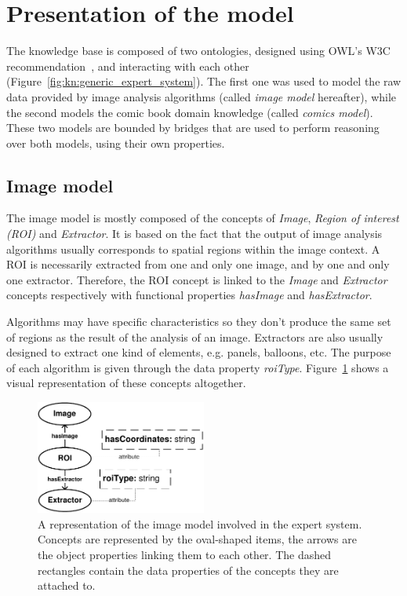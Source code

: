 
\section{Presentation of the model} %
\label{sec:kn:model}

The knowledge base is composed of two ontologies, designed using OWL's W3C recommendation~\cite{McGuinness2004}, and interacting with each other (Figure~\ref{fig:kn:generic_expert_system}).
The first one was used to model the raw data provided by image analysis algorithms (called \textit{image model} hereafter), while the second models the comic book domain knowledge (called \textit{comics model}).
These two models are bounded by bridges that are used to perform reasoning over both models, using their own properties.

\subsection{Image model}
The image model is mostly composed of the concepts of \textit{Image}, \textit{Region of interest (ROI)} and \textit{Extractor}.
It is based on the fact that the output of image analysis algorithms usually corresponds to spatial regions within the image context.
A ROI is necessarily extracted from one and only one image, and by one and only one extractor.
Therefore, the ROI concept is linked to the \textit{Image} and \textit{Extractor} concepts respectively with functional properties \textit{hasImage} and \textit{hasExtractor}.

Algorithms may have specific characteristics so they don't produce the same set of regions as the result of the analysis of an image.
Extractors are also usually designed to extract one kind of elements, e.g. panels, balloons, etc.
The purpose of each algorithm is given through the data property \textit{roiType}.
Figure~\ref{fig:kn:model_image} shows a visual representation of these concepts altogether.

 \begin{figure}[!ht]
   \centering
  \includegraphics[width=0.5\textwidth]{model_image.pdf}
  \caption[A representation of the image model involved in the expert system]{A representation of the image model involved in the expert system. Concepts are represented by the oval-shaped items, the arrows are the object properties linking them to each other. The dashed rectangles contain the data properties of the concepts they are attached to.}
  \label{fig:kn:model_image}
 \end{figure}


